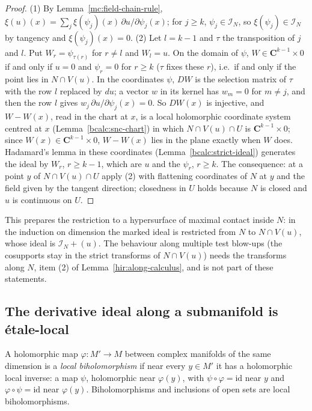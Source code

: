 \begin{proof}
\leanok
(1) By Lemma~\ref{mc:field-chain-rule}, \(\xi(u)(x)=\sum_j\xi(\psi_j)(x)\,\partial u/\partial\psi_j(x)\); for \(j\ge k\), \(\psi_j\in\mathcal I_N\), so \(\xi(\psi_j)\in\mathcal I_N\) by
tangency and \(\xi(\psi_j)(x)=0\).
(2) Let \(l=k-1\) and \(\tau\) the transposition of \(j\) and \(l\). Put \(W_r=\psi_{\tau(r)}\) for \(r\ne l\) and \(W_l=u\). On the domain of \(\psi\), \(W\in\mathbf C^{k-1}\times0\)
if and only if \(u=0\) and \(\psi_r=0\) for \(r\ge k\) (\(\tau\) fixes these \(r\)), i.e.\ if and only if the point lies in \(N\cap V(u)\). In the coordinates \(\psi\), \(DW\) is
the selection matrix of \(\tau\) with the row \(l\) replaced by \(du\); a vector \(w\) in its kernel has \(w_m=0\) for \(m\ne j\), and then the row \(l\) gives
\(w_j\,\partial u/\partial\psi_j(x)=0\). So \(DW(x)\) is injective, and \(W-W(x)\), read in the chart at \(x\), is a local holomorphic coordinate system centred at \(x\)
(Lemma~\ref{bcalc:snc-chart}) in which \(N\cap V(u)\cap U\) is \(\mathbf C^{k-1}\times0\); since \(W(x)\in\mathbf C^{k-1}\times0\), \(W-W(x)\) lies in the plane exactly when \(W\) does.
Hadamard's lemma in these coordinates (Lemma~\ref{bcalc:strict-ideal}) generates the ideal by \(W_r\), \(r\ge k-1\), which are \(u\) and the \(\psi_r\), \(r\ge k\).
The consequence: at a point \(y\) of \(N\cap V(u)\cap U\) apply (2) with flattening coordinates of \(N\) at \(y\) and the field given by the tangent direction; closedness in
\(U\) holds because \(N\) is closed and \(u\) is continuous on \(U\).
\end{proof}
This prepares the restriction to a hypersurface of maximal contact inside \(N\): in the induction on dimension the marked ideal is restricted from \(N\) to
\(N\cap V(u)\), whose ideal is \(\mathcal I_N+(u)\). The behaviour along multiple test blow-ups (the cosupports stay in the strict transforms of \(N\cap V(u)\)) needs
the transforms along \(N\), item (2) of Lemma~\ref{hir:along-calculus}, and is not part of these statements.

\subsection{The derivative ideal along a submanifold is étale-local}

A holomorphic map \(\varphi\colon M'\to M\) between complex manifolds of the same dimension is a \emph{local biholomorphism} if near every \(y\in M'\) it has a
holomorphic local inverse: a map \(\psi\), holomorphic near \(\varphi(y)\), with \(\psi\circ\varphi=\mathrm{id}\) near \(y\) and \(\varphi\circ\psi=\mathrm{id}\) near
\(\varphi(y)\). Biholomorphisms and inclusions of open sets are local biholomorphisms.

